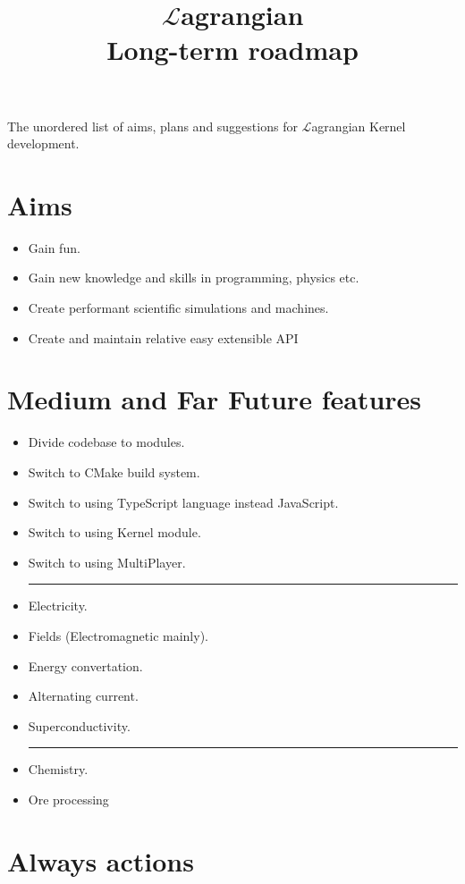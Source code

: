 \documentclass[12pt]{article}
\title{$\mathcal{L}$agrangian \\ Long-term roadmap}
\begin{document}
	\maketitle

	The unordered list of aims, plans and suggestions for $\mathcal{L}$agrangian Kernel development.

	\section{Aims}

	\begin{itemize}
		\item Gain fun.
		\item Gain new knowledge and skills in programming, physics etc.
		\item Create performant scientific simulations and machines.
		\item Create and maintain relative easy extensible API
	\end{itemize}

	\section{Medium and Far Future features}

	\begin{itemize}
		\item Divide codebase to modules.
		\item Switch to CMake build system.
		\item Switch to using TypeScript language instead JavaScript.
		\item Switch to using Kernel module.
		\item Switch to using MultiPlayer. \\
		\noindent\rule{\textwidth}{0.4pt}
		\item Electricity.
		\item Fields (Electromagnetic mainly).
		\item Energy convertation.
		\item Alternating current.
		\item Superconductivity. \\
		\noindent\rule{\textwidth}{0.4pt}
		\item Chemistry.
		\item Ore processing
	\end{itemize}

	\section{Always actions}
\end{document}
